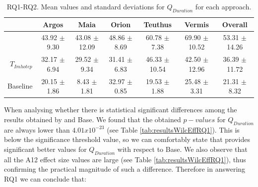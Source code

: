 \begin{table}[tb]
\centering
\caption{RQ1-RQ2. Mean values and standard deviations for $Q_{Duration}$ for each approach.}
\label{tab:resultsMeanStDevRQ12}
\begin{tabular}{@{}ccccccc@{}}
\toprule
    & Argos            & Maia              & Orion            & Teuthus           & Vermis            & Overall           \\ \midrule
                                   \rowcolor[HTML]{C0C0C0}
\multicolumn{1}{r}{\cellcolor[HTML]{FFFFFF}{$S_{Imhotep}$}} & 43.92 $\pm$ 9.30 & 43.08 $\pm$ 12.09 & 48.86 $\pm$ 8.69 & 60.78 $\pm$ 7.38  & 69.90 $\pm$ 10.52 & 53.31 $\pm$ 14.26 \\ \midrule
\multicolumn{1}{r}{$T_{Imhotep}$} & 32.17 $\pm$ 6.94 & 29.52 $\pm$ 9.34  & 31.41 $\pm$ 6.83 & 46.33 $\pm$ 10.54 & 42.50 $\pm$ 12.96 & 36.39 $\pm$ 11.72 \\ \midrule
\multicolumn{1}{r}{Baseline} & 20.15 $\pm$ 1.86 & 8.43 $\pm$ 1.81   & 32.97 $\pm$ 0.85 & 19.53 $\pm$ 1.88  & 25.48 $\pm$ 3.31  & 21.31 $\pm$ 8.32  \\ \bottomrule
\end{tabular}
\end{table}


When analysing whether there is statistical significant differences among the results obtained by \simhotep{} and Base. We found that the obtained $p-values$ for $Q_{Duration}$ are always lower than $4.01x10^{-23}$  (see Table \ref{tab:resultsWilcEffRQ1}). This is below the significance threshold value, so we can comfortably state that \simhotep{} provides significant better values for $Q_{Duration}$ with respect to Base. We also observe that all the  A12 effect size values are large (see Table \ref{tab:resultsWilcEffRQ1}), thus confirming the practical magnitude of such a difference.
Therefore in answering RQ1 we can conclude that:

